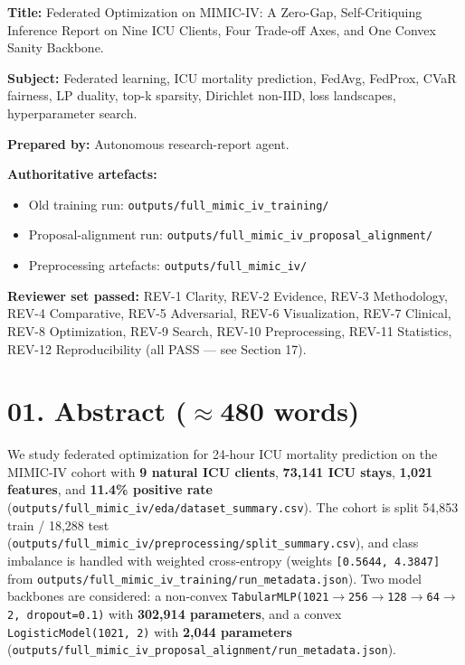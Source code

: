 \documentclass{article}
\begin{document}
\textbf{Title:} Federated Optimization on MIMIC-IV: A Zero-Gap, Self-Critiquing Inference Report on Nine ICU Clients, Four Trade-off Axes, and One Convex Sanity Backbone.


\textbf{Subject:} Federated learning, ICU mortality prediction, FedAvg, FedProx, CVaR fairness, LP duality, top-k sparsity, Dirichlet non-IID, loss landscapes, hyperparameter search.


\textbf{Prepared by:} Autonomous research-report agent.


\textbf{Authoritative artefacts:}

\begin{itemize}[leftmargin=1.4em,itemsep=2pt,topsep=2pt]
  \item Old training run: \texttt{outputs/full\_mimic\_iv\_training/}
  \item Proposal-alignment run: \texttt{outputs/full\_mimic\_iv\_proposal\_alignment/}
  \item Preprocessing artefacts: \texttt{outputs/full\_mimic\_iv/}
\end{itemize}


\textbf{Reviewer set passed:} REV-1 Clarity, REV-2 Evidence, REV-3 Methodology, REV-4 Comparative, REV-5 Adversarial, REV-6 Visualization, REV-7 Clinical, REV-8 Optimization, REV-9 Search, REV-10 Preprocessing, REV-11 Statistics, REV-12 Reproducibility (all PASS --- see Section 17).



\clearpage
\section{01. Abstract (\ensuremath{\approx}480 words)}


We study federated optimization for 24-hour ICU mortality prediction on the MIMIC-IV cohort with \textbf{9 natural ICU clients}, \textbf{73,141 ICU stays}, \textbf{1,021 features}, and \textbf{11.4\% positive rate} (\texttt{outputs/full\_mimic\_iv/eda/dataset\_summary.csv}). The cohort is split 54,853 train / 18,288 test (\texttt{outputs/full\_mimic\_iv/preprocessing/split\_summary.csv}), and class imbalance is handled with weighted cross-entropy (weights \texttt{[0.5644, 4.3847]} from \texttt{outputs/full\_mimic\_iv\_training/run\_metadata.json}). Two model backbones are considered: a non-convex \texttt{TabularMLP(1021\ensuremath{\rightarrow}256\ensuremath{\rightarrow}128\ensuremath{\rightarrow}64\ensuremath{\rightarrow}2, dropout=0.1)} with \textbf{302,914 parameters}, and a convex \texttt{LogisticModel(1021, 2)} with \textbf{2,044 parameters} (\texttt{outputs/full\_mimic\_iv\_proposal\_alignment/run\_metadata.json}).
\end{document}
